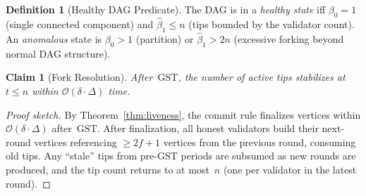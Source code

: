 \documentclass[11pt,a4paper]{article}
\newtheorem{claim}[theorem]{Claim}
\theoremstyle{definition}
\newtheorem{definition}[theorem]{Definition}
\theoremstyle{remark}
\newcommand{\GST}{\mathrm{GST}}
\newcommand{\bigO}{\mathcal{O}}
\begin{document}
\begin{definition}[Healthy DAG Predicate]\label{def:healthy}
The DAG is in a \emph{healthy state} iff $\beta_0 = 1$ (single connected
component) and $\hat{\beta}_1 \leq n$ (tips bounded by the validator count).
An \emph{anomalous} state is $\beta_0 > 1$ (partition) or
$\hat{\beta}_1 > 2n$ (excessive forking beyond normal DAG structure).
\end{definition}

\begin{claim}[Fork Resolution]\label{clm:fork-resolution}
After~$\GST$, the number of active tips stabilizes at~$t \leq n$
within $\bigO(\delta \cdot \Delta)$ time.
\end{claim}

\begin{proof}[Proof sketch]
By Theorem~\ref{thm:liveness}, the commit rule finalizes vertices
within $\bigO(\delta \cdot \Delta)$ after~$\GST$.
After finalization, all honest validators build their next-round vertices
referencing $\geq 2f+1$ vertices from the previous round, consuming
old tips.
Any ``stale'' tips from pre-$\GST$ periods are subsumed as new rounds
are produced, and the tip count returns to at most~$n$ (one per
validator in the latest round).
\end{proof}
\end{document}
